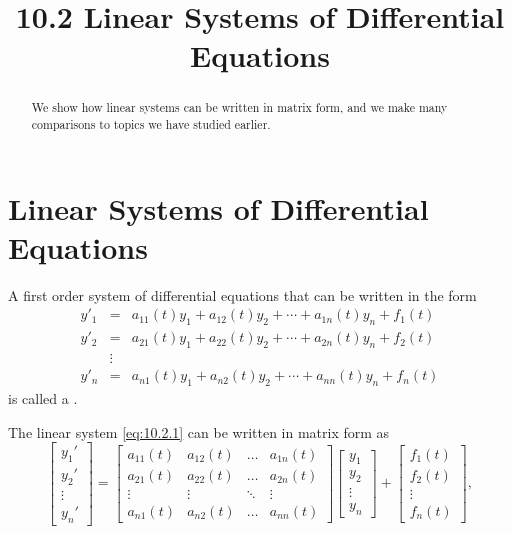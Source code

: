 \documentclass{ximera}
\title{10.2 Linear Systems of Differential Equations}%
\begin{document}
\begin{abstract}
We show how linear systems can be written in matrix form, and we make many comparisons to topics we have studied earlier.
\end{abstract}

\maketitle

\section*{Linear Systems of Differential Equations}

A  first order system of  differential equations that can be written in
the form
\begin{equation} \label{eq:10.2.1}
\begin{array}{ccl}
y'_1&=&a_{11}(t)y_1+a_{12}(t)y_2+\cdots+a_{1n}(t)y_n+f_1(t)\\
y'_2&=&a_{21}(t)y_1+a_{22}(t)y_2+\cdots+a_{2n}(t)y_n+f_2(t)\\
&\vdots\\
y'_n&
=&a_{n1}(t)y_1+a_{n2}(t)y_2+\cdots+a_{nn}(t)y_n+f_n(t)\end{array}
\end{equation}
is called a .

The linear system \eqref{eq:10.2.1}  can be written in matrix form as
$$
\begin{bmatrix}y_1'\\y_2'\\\vdots\\y_n'\end{bmatrix}=\begin{bmatrix}a_{11}(t)&a_{12}(t)&\dots &a_{1n}(t)\\
a_{21}(t)&a_{22}(t)&\dots &a_{2n}(t)\\
\vdots &\vdots &\ddots &\vdots\\
a_{n1}(t)&a_{n2}(t)&\dots &a_{nn}(t)\end{bmatrix}\begin{bmatrix}y_1\\y_2\\\vdots\\y_n\end{bmatrix}+\begin{bmatrix}f_1(t)\\f_2(t)\\\vdots\\f_n(t)\end{bmatrix},
$$
\end{document}
